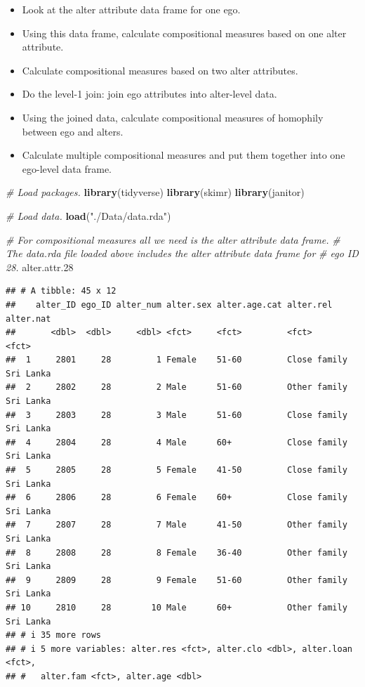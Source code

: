 \documentclass[
]{book}
\newenvironment{Shaded}{\begin{snugshade}}{\end{snugshade}}
\newcommand{\CommentTok}[1]{\textcolor[rgb]{0.56,0.35,0.01}{\textit{#1}}}
\newcommand{\FloatTok}[1]{\textcolor[rgb]{0.00,0.00,0.81}{#1}}
\newcommand{\FunctionTok}[1]{\textcolor[rgb]{0.13,0.29,0.53}{\textbf{#1}}}
\newcommand{\NormalTok}[1]{#1}
\newcommand{\StringTok}[1]{\textcolor[rgb]{0.31,0.60,0.02}{#1}}
\providecommand{\tightlist}{%
  \setlength{\itemsep}{0pt}\setlength{\parskip}{0pt}}
\begin{document}
\begin{itemize}
  \begin{itemize}
  \tightlist
  \item
    Look at the alter attribute data frame for one ego.
  \item
    Using this data frame, calculate compositional measures based on one alter attribute.
  \item
    Calculate compositional measures based on two alter attributes.
  \item
    Do the level-1 join: join ego attributes into alter-level data.
  \item
    Using the joined data, calculate compositional measures of homophily between ego and alters.
  \item
    Calculate multiple compositional measures and put them together into one ego-level data frame.
  \end{itemize}
\end{itemize}

\begin{Shaded}
\begin{Highlighting}[]
\CommentTok{\# Load packages.}
\FunctionTok{library}\NormalTok{(tidyverse)}
\FunctionTok{library}\NormalTok{(skimr)}
\FunctionTok{library}\NormalTok{(janitor)}

\CommentTok{\# Load data.}
\FunctionTok{load}\NormalTok{(}\StringTok{"./Data/data.rda"}\NormalTok{)}

\CommentTok{\# For compositional measures all we need is the alter attribute data frame.}
\CommentTok{\# The data.rda file loaded above includes the alter attribute data frame for}
\CommentTok{\# ego ID 28.}
\NormalTok{alter.attr}\FloatTok{.28}
\end{Highlighting}
\end{Shaded}

\begin{verbatim}
## # A tibble: 45 x 12
##    alter_ID ego_ID alter_num alter.sex alter.age.cat alter.rel    alter.nat
##       <dbl>  <dbl>     <dbl> <fct>     <fct>         <fct>        <fct>    
##  1     2801     28         1 Female    51-60         Close family Sri Lanka
##  2     2802     28         2 Male      51-60         Other family Sri Lanka
##  3     2803     28         3 Male      51-60         Close family Sri Lanka
##  4     2804     28         4 Male      60+           Close family Sri Lanka
##  5     2805     28         5 Female    41-50         Close family Sri Lanka
##  6     2806     28         6 Female    60+           Close family Sri Lanka
##  7     2807     28         7 Male      41-50         Other family Sri Lanka
##  8     2808     28         8 Female    36-40         Other family Sri Lanka
##  9     2809     28         9 Female    51-60         Other family Sri Lanka
## 10     2810     28        10 Male      60+           Other family Sri Lanka
## # i 35 more rows
## # i 5 more variables: alter.res <fct>, alter.clo <dbl>, alter.loan <fct>,
## #   alter.fam <fct>, alter.age <dbl>
\end{verbatim}
\end{document}
